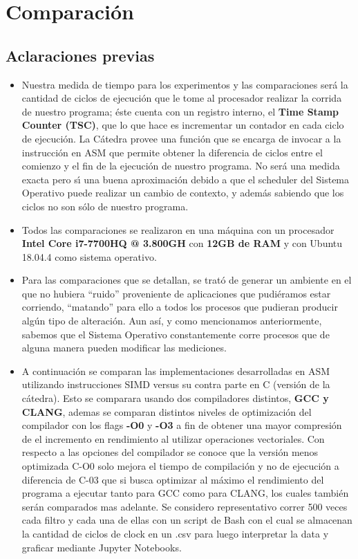 \documentclass[a4paper]{article}
\begin{document}
\newpage
\section{Comparación}
\subsection{Aclaraciones previas}
\begin{itemize}
 \item Nuestra medida de tiempo para los experimentos y las comparaciones será la cantidad de ciclos de ejecución que le tome al procesador realizar la corrida de nuestro programa; éste cuenta con un registro interno, el \textbf{Time Stamp Counter (TSC)}, que lo que hace es incrementar un contador en cada ciclo de ejecución. La Cátedra provee una función que se encarga de invocar a la instrucción en ASM que permite obtener la diferencia de ciclos entre el comienzo y el fin de la ejecución de nuestro programa. No será una medida exacta pero sı́ una buena aproximación debido a que el scheduler del Sistema Operativo puede realizar un cambio de contexto, y además sabiendo que los ciclos no son sólo de nuestro programa.

\item Todos las comparaciones se realizaron en una máquina con un procesador \textbf{Intel Core i7-7700HQ @ 3.800GH} con \textbf{12GB de RAM} y con Ubuntu 18.04.4 como sistema operativo.

\item Para las comparaciones que se detallan, se trató de generar un ambiente en el que no hubiera ``ruido'' proveniente de aplicaciones que pudiéramos estar corriendo, ``matando'' para ello a todos los procesos que pudieran producir algún tipo de alteración. Aun así, y como mencionamos anteriormente, sabemos que el Sistema Operativo constantemente corre procesos que de alguna manera pueden modificar las mediciones.

\item A continuación se comparan las implementaciones desarrolladas en ASM utilizando instrucciones SIMD versus su contra parte en C (versión de la cátedra). Esto se comparara usando dos compiladores distintos, \textbf{GCC y CLANG}, ademas se comparan distintos niveles de optimización del compilador con los flags \textbf{-O0} y \textbf{-O3} a fin de obtener una mayor compresión de el incremento en rendimiento al utilizar operaciones vectoriales. Con respecto a las opciones del compilador se conoce que la versión menos optimizada C-O0 solo mejora el tiempo de compilación y no de ejecución a diferencia de C-03 que si busca optimizar al máximo el rendimiento del programa a ejecutar tanto para GCC como para CLANG, los cuales también serán comparados mas adelante. Se considero representativo correr 500 veces cada filtro y cada una de ellas con un script de Bash con el cual se almacenan la cantidad de ciclos de clock en un .csv para luego interpretar la data y graficar mediante Jupyter Notebooks. 
\end{itemize}
\end{document}
